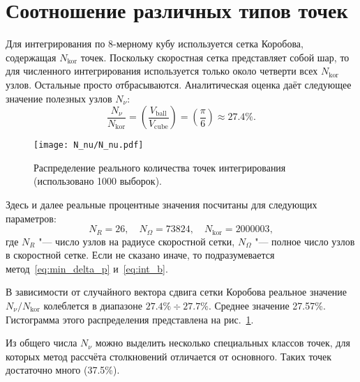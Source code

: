 \documentclass[english,russian,a4paper,12pt]{article}
\begin{document}
\section{Соотношение различных типов точек}

Для интегрирования по 8-мерному кубу используется сетка Коробова, содержащая \(N_\mathrm{kor}\) точек.
Поскольку скоростная сетка представляет собой шар, то для численного интегрирования используется
только около четверти всех \(N_\mathrm{kor}\) узлов. Остальные просто отбрасываются.
Аналитическая оценка даёт следующее значение полезных узлов \(N_\nu\):
\[ \frac{N_\nu}{N_\mathrm{kor}} = \left(\frac{V_\mathrm{ball}}{V_\mathrm{cube}}\right) =\left(\frac\pi6\right) \approx 27.4 \%. \]

\begin{figure}[ht]
	\centering
	\texttt{[image: N\_nu/N\_nu.pdf]}
	\caption{Распределение реального количества точек интегрирования (использовано 1000 выборок).}
	\label{fig:N_nu}
\end{figure}

Здесь и далее реальные процентные значения посчитаны для следующих параметров:
\[ N_R = 26, \quad N_\Omega = 73824, \quad N_\mathrm{kor} = 2000003, \]
где \(N_R\) "--- число узлов на радиусе скоростной сетки, \(N_\Omega\) "--- полное число узлов в скоростной сетке.
Если не сказано иначе, то подразумевается метод~\eqref{eq:min_delta_p} и~\eqref{eq:int_b}.

В зависимости от случайного вектора сдвига сетки Коробова реальное значение \(N_\nu/N_\mathrm{kor}\)
колеблется в диапазоне \(27.4\% \div 27.7\%\). Среднее значение 27.57\%.
Гистограмма этого распределения представлена на рис.~\ref{fig:N_nu}.

Из общего числа \(N_\nu\) можно выделить несколько специальных классов точек,
для которых метод рассчёта столкновений отличается от основного.
Таких точек достаточно много (37.5\%).
\end{document}
